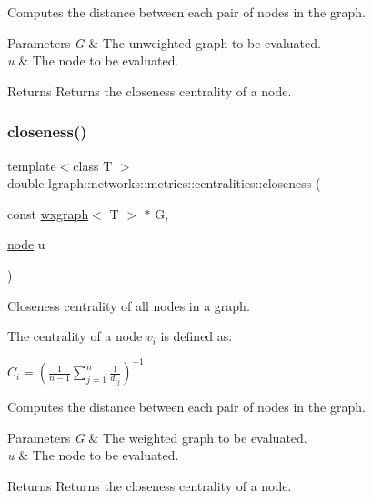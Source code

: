 Computes the distance between each pair of nodes in the graph. 
\begin{DoxyParams}{Parameters}
{\em G} & The unweighted graph to be evaluated. \\
\hline
{\em u} & The node to be evaluated. \\
\hline
\end{DoxyParams}
\begin{DoxyReturn}{Returns}
Returns the closeness centrality of a node. 
\end{DoxyReturn}
\mbox{\label{namespacelgraph_1_1networks_1_1metrics_1_1centralities_a641608dcaecba5d3636237bd15da2e96}} 
\subsubsection{\texorpdfstring{closeness()}{closeness()}\hspace{0.1cm}{\footnotesize\ttfamily [2/6]}}
{\footnotesize\ttfamily template$<$class T $>$ \\
double lgraph\+::networks\+::metrics\+::centralities\+::closeness (\begin{DoxyParamCaption}\item[{const \hyperlink{classlgraph_1_1wxgraph}{wxgraph}$<$ T $>$ $\ast$}]{G,  }\item[{\hyperlink{namespacelgraph_a397169dd66adf725210a30fb7251773e}{node}}]{u }\end{DoxyParamCaption})}



Closeness centrality of all nodes in a graph. 

The centrality of a node $v_i$ is defined as\+:

$C_i = \left( \frac{1}{n - 1} \sum_{j=1}^n \frac{1}{d_{ij}} \right)^{-1}$

Computes the distance between each pair of nodes in the graph. 
\begin{DoxyParams}{Parameters}
{\em G} & The weighted graph to be evaluated. \\
\hline
{\em u} & The node to be evaluated. \\
\hline
\end{DoxyParams}
\begin{DoxyReturn}{Returns}
Returns the closeness centrality of a node. 
\end{DoxyReturn}
\mbox{\label{namespacelgraph_1_1networks_1_1metrics_1_1centralities_aa7252de7745ee93430ddef0b64643077}} 
